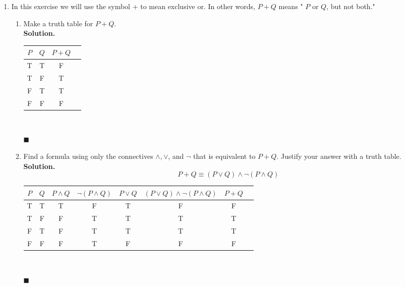 \documentclass{report}
\newcommand{\sol}{\vspace{1em}\\\textbf{Solution.}\vspace{0.5em}}
\newcommand{\qed}{\ \\\strut\hfill$\blacksquare$\vspace{1em}}
\begin{document}
\begin{enumerate}[leftmargin=*]
    \item In this exercise we will use the symbol + to mean exclusive or. In other words,
          $P+Q$ means " $P$ or $Q$, but not both."
          \begin{enumerate}
              \item Make a truth table for $P+Q$. \sol{}
                    \begin{center}
                        \begin{tabular}{cccc}
                            $P$ & $Q$ & $P+Q$ \\
                            \hline
                            T   & T   & F     \\
                            T   & F   & T     \\
                            F   & T   & T     \\
                            F   & F   & F
                        \end{tabular}
                    \end{center}\qed

              \item Find a formula using only the connectives $\wedge, \vee$, and $\neg$ that is
                    equivalent to $P+Q$. Justify your answer with a truth table. \sol{}
                    \[
                        P+Q \equiv (P \vee Q) \wedge \neg(P \wedge Q)
                    \]
                    \begin{center}
                        \begin{tabular}{cccccccc}
                            $P$ & $Q$ & $P \wedge Q$ & $\neg(P \wedge Q)$ & $P \vee Q$ & $(P \vee Q) \wedge \neg(P \wedge Q)$ & $P+Q$ \\
                            \hline
                            T   & T   & T            & F                  & T          & F                                    & F     \\
                            T   & F   & F            & T                  & T          & T                                    & T     \\
                            F   & T   & F            & T                  & T          & T                                    & T     \\
                            F   & F   & F            & T                  & F          & F                                    & F
                        \end{tabular}
                    \end{center}\qed
          \end{enumerate}


\end{enumerate}
\end{document}
